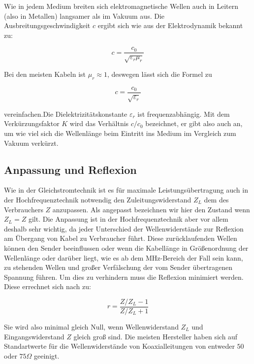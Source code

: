 	Wie in jedem Medium breiten sich elektromagnetische Wellen auch in Leitern (also in Metallen) langsamer als im Vakuum aus. 
	Die Ausbreitungsgeschwindigkeit $c$ ergibt sich wie aus der Elektrodynamik bekannt zu:

	\begin{equation}		
		c = \dfrac{c_0}{\sqrt{\varepsilon_r \mu_r}}		
	\end{equation}

	Bei den meisten Kabeln ist $\mu_r \approx 1$, deswegen lässt sich die Formel zu

	\begin{equation}		
		c = \dfrac{c_0}{\sqrt{\varepsilon_r}}		
	\end{equation}

	vereinfachen.Die Dielektrizitätskonstante $\varepsilon_r$ ist frequenzabhängig. 
	Mit dem Verkürzungsfaktor $K$ wird das Verhältnis $c/c_0$ bezeichnet, er gibt also auch an, um wie viel sich die Wellenlänge beim Eintritt ins Medium im Vergleich zum Vakuum verkürzt.\cite{unterlagen}


\subsection{Anpassung und Reflexion} %
\label{sub:anpassung_und_reflexion}

	Wie in der Gleichstromtechnik ist es für maximale Leistungsübertragung auch in der Hochfrequenztechnik notwendig den Zuleitungswiderstand $Z_L$ dem des Verbrauchers $Z$ anzupassen. 
	Als angepasst bezeichnen wir hier den Zustand wenn $Z_L = Z$ gilt. 
	Die Anpassung ist in der Hochfrequenztechnik aber vor allem deshalb sehr wichtig, da jeder Unterschied der Wellenwiderstände zur Reflexion am Übergang von Kabel zu Verbraucher führt. 
	Diese zurücklaufenden Wellen können den Sender beeinflussen oder wenn die Kabellänge in Größenordnung der Wellenlänge oder darüber liegt, wie es ab dem MHz-Bereich der Fall sein kann, zu stehenden Wellen und großer Verfälschung der vom Sender übertragenen Spannung führen. 
	Um dies zu verhindern muss die Reflexion minimiert werden. Diese errechnet sich nach \cite{buch} zu:

	\begin{equation}	
		r = \dfrac{Z/Z_L - 1}{Z/Z_L + 1}		
	\end{equation}

	Sie wird also minimal gleich Null, wenn Wellenwiderstand $Z_L$ und Eingangswiderstand $Z$ gleich groß sind. \cite{unterlagen}
	Die meisten Hersteller haben sich auf Standartwerte für die Wellenwiderstände von Koaxialleitungen von entweder $50$ oder $75\Omega$ geeinigt. \cite{wikikoax}

